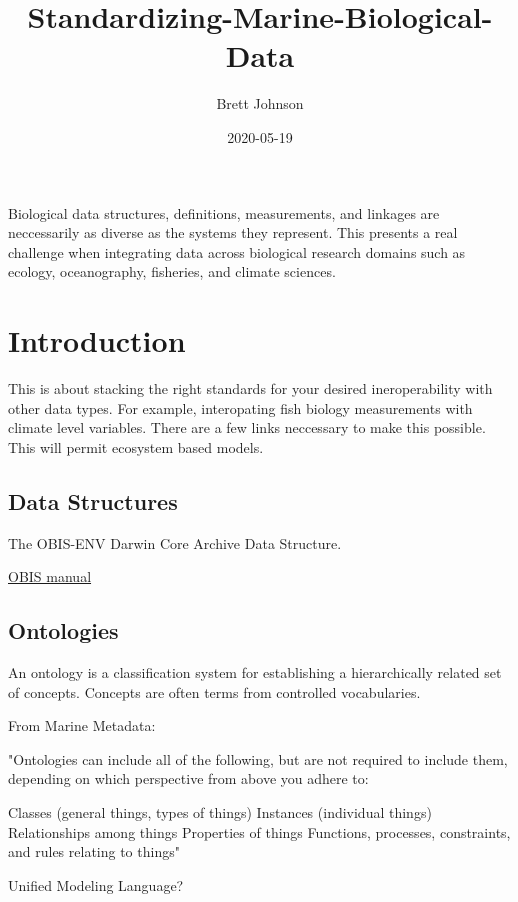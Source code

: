 \documentclass[]{book}
\title{Standardizing-Marine-Biological-Data}
\author{Brett Johnson}
\date{2020-05-19}
\begin{document}
\maketitle

{
\setcounter{tocdepth}{1}
\tableofcontents
}
Biological data structures, definitions, measurements, and linkages are neccessarily as diverse as the systems they represent. This presents a real challenge when integrating data across biological research domains such as ecology, oceanography, fisheries, and climate sciences.

\hypertarget{intro}{%
\chapter{Introduction}\label{intro}}

This is about stacking the right standards for your desired ineroperability with other data types. For example, interopating fish biology measurements with climate level variables. There are a few links neccessary to make this possible. This will permit ecosystem based models.

\hypertarget{data-structures}{%
\section{Data Structures}\label{data-structures}}

The OBIS-ENV Darwin Core Archive Data Structure.

\href{\%22https://obis.org/manual/\%22}{OBIS manual}

\hypertarget{ontologies}{%
\section{Ontologies}\label{ontologies}}

An ontology is a classification system for establishing a hierarchically related set of concepts. Concepts are often terms from controlled vocabularies.

From Marine Metadata:

"Ontologies can include all of the following, but are not required to include them, depending on which perspective from above you adhere to:

Classes (general things, types of things)
Instances (individual things)
Relationships among things
Properties of things
Functions, processes, constraints, and rules relating to things"

Unified Modeling Language?
\end{document}
